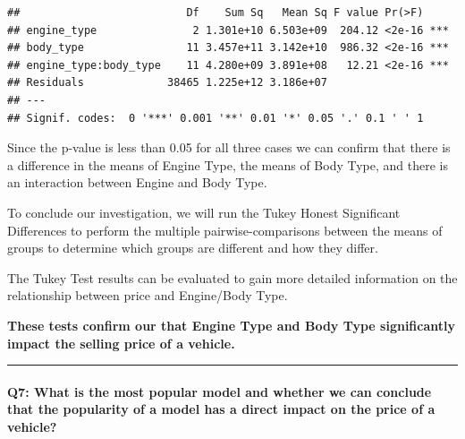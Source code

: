 \documentclass[
]{article}
\newenvironment{Shaded}{\begin{snugshade}}{\end{snugshade}}
\newcommand{\CommentTok}[1]{\textcolor[rgb]{0.56,0.35,0.01}{\textit{#1}}}
\newcommand{\DocumentationTok}[1]{\textcolor[rgb]{0.56,0.35,0.01}{\textbf{\textit{#1}}}}
\newcommand{\FunctionTok}[1]{\textcolor[rgb]{0.00,0.00,0.00}{#1}}
\newcommand{\NormalTok}[1]{#1}
\begin{document}
\begin{verbatim}
##                          Df    Sum Sq   Mean Sq F value Pr(>F)    
## engine_type               2 1.301e+10 6.503e+09  204.12 <2e-16 ***
## body_type                11 3.457e+11 3.142e+10  986.32 <2e-16 ***
## engine_type:body_type    11 4.280e+09 3.891e+08   12.21 <2e-16 ***
## Residuals             38465 1.225e+12 3.186e+07                   
## ---
## Signif. codes:  0 '***' 0.001 '**' 0.01 '*' 0.05 '.' 0.1 ' ' 1
\end{verbatim}

Since the p-value is less than 0.05 for all three cases we can confirm
that there is a difference in the means of Engine Type, the means of
Body Type, and there is an interaction between Engine and Body Type.

To conclude our investigation, we will run the Tukey Honest Significant
Differences to perform the multiple pairwise-comparisons between the
means of groups to determine which groups are different and how they
differ.

\begin{Shaded}
\end{Shaded}

The Tukey Test results can be evaluated to gain more detailed
information on the relationship between price and Engine/Body Type.

\textbf{These tests confirm our that Engine Type and Body Type
significantly impact the selling price of a vehicle.}

\begin{center}\rule{0.5\linewidth}{0.5pt}\end{center}

\hypertarget{q7-what-is-the-most-popular-model-and-whether-we-can-conclude-that-the-popularity-of-a-model-has-a-direct-impact-on-the-price-of-a-vehicle}{%
\paragraph{\texorpdfstring{\textbf{Q7:} What is the most popular model
and whether we can conclude that the popularity of a model has a direct
impact on the price of a
vehicle?}{Q7: What is the most popular model and whether we can conclude that the popularity of a model has a direct impact on the price of a vehicle?}}\label{q7-what-is-the-most-popular-model-and-whether-we-can-conclude-that-the-popularity-of-a-model-has-a-direct-impact-on-the-price-of-a-vehicle}}
\end{document}
